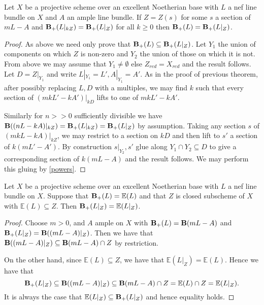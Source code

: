 \begin{lemma}\label{reduce}
	Let $X$ be a projective scheme over an excellent Noetherian base with $L$ a nef line bundle on $X$ and $A$ an ample line bundle. If $Z=Z(s)$ for some $s$ a section of $mL-A$ and $\mathbf{B}_{+}(L|_{kZ})=\mathbf{B}_{+}(L|_{Z})$ for all $k \geq 0$ then $\mathbf{B}_{+}(L)=\mathbf{B}_{+}(L|_{Z})$.
\end{lemma}

\begin{proof}
	As above we need only prove that $\mathbf{B}_{+}(L)\subseteq \mathbf{B}_{+}(L|_{Z})$.	Let $Y_{1}$ the union of components on which $Z$ is non-zero and $Y_{2}$ the union of those on which it is not. From above we may assume that $Y_{1} \neq \emptyset$ else $Z_{red}=X_{red}$ and the result follows. Let $D=Z|_{Y_{1}}$ and write $L|_{Y_{1}}=L', A|_{Y_{1}}=A'$. As in the proof of previous theorem, after possibly replacing $L,D$ with a multiples, we may find $k$ such that every section of $(mkL'-kA')|_{kD}$ lifts to one of $mkL'-kA'$. 
	
	Similarly for $n>>0$ sufficiently divisible we have $\mathbf{B}((nL-kA)|_{kZ})=\mathbf{B}_{+}(L|_{kZ})=\mathbf{B}_{+}(L|_{Z})$ by assumption. Taking any section $s$ of $(mkL-kA)|_{kZ}$, we may restrict to a section on $kD$ and then lift to $s'$ a section of $k(mL'-A')$. By construction $s|_{Y_{2}},s'$ glue along $Y_{1}\cap Y_{2}\subseteq D$ to give a corresponding section of $k(mL-A)$ and the result follows. We may perform this gluing by \autoref{powers}.
\end{proof}


\begin{lemma}\label{red-eq}
	
	Let $X$ be a projective scheme over an excellent Noetherian base with $L$ a nef line bundle on $X$. Suppose that $\mathbf{B}_{+}(L)=\mathbb{E}(L)$ and that $Z$ is closed subscheme of $X$ with $\mathbb{E}(L) \subseteq Z$. Then $\mathbf{B}_{+}(L|_{Z})=\mathbb{E}(L|_{Z})$.
	
\end{lemma}

\begin{proof}
	
	Choose $m> 0$, and $A$ ample on $X$ with $\mathbf{B}_{+}(L)=\mathbf{B}(mL-A)$ and $\mathbf{B}_{+}(L|_{Z})=\mathbf{B}((mL-A)|_{Z})$. Then we have that $\mathbf{B}((mL-A)|_{Z}) \subseteq \mathbf{B}(mL-A)\cap Z$ by restriction.
	
	On the other hand, since $\mathbb{E}(L) \subseteq Z$, we have that $\mathbb{E}(L|_{Z}) = \mathbb{E}(L)$. Hence we have that $$\mathbf{B}_{+}(L|_{Z})\subseteq \mathbf{B}((mL-A)|_{Z})\subseteq \mathbf{B}(mL-A)\cap Z =\mathbb{E}(L) \cap Z =\mathbb{E}(L|_{Z}).$$
	It is always the case that $\mathbb{E}(L|_{Z}) \subseteq \mathbf{B}_{+}(L|_{Z})$ and hence equality holds.
	
	
\end{proof}


